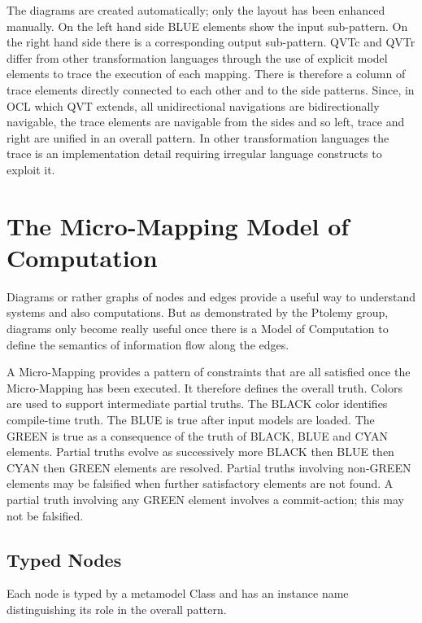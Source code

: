 \documentclass[conference]{IEEEtran}
\begin{document}
The diagrams are created automatically; only the layout has been enhanced manually. On the left hand side BLUE elements show the input sub-pattern. On the right hand side there is a corresponding output sub-pattern. QVTc and QVTr differ from other transformation languages through the use of explicit model elements to trace the execution of each mapping. There is therefore a column of trace elements directly connected to each other and to the side patterns. Since, in OCL which QVT extends, all unidirectional navigations are bidirectionally navigable, the trace elements are navigable from the sides and so left, trace and right are unified in an overall pattern. In other transformation languages the trace is an implementation detail requiring irregular language constructs to exploit it.

\section{The Micro-Mapping Model of Computation}\label{The Micro-Mapping Model of Computation}

Diagrams or rather graphs of nodes and edges provide a useful way to understand systems and also computations. But as demonstrated by the Ptolemy group, diagrams only become really useful once there is a Model of Computation \cite{moc} to define the semantics of information flow along the edges.%

A Micro-Mapping provides a pattern of constraints that are all satisfied once the Micro-Mapping has been executed. It therefore defines the overall truth. Colors are used to support intermediate partial truths. The BLACK color identifies compile-time truth. The BLUE is true after input models are loaded. The GREEN  is true as a consequence of the truth of BLACK, BLUE and CYAN elements. Partial truths evolve as successively more BLACK then BLUE then CYAN then GREEN elements are resolved. Partial truths involving non-GREEN elements may be falsified when further satisfactory elements are not found. A partial truth involving any GREEN element involves a commit-action; this may not be falsified. 

\subsection{Typed Nodes}

Each node is typed by a metamodel Class and has an instance name distinguishing its role in the overall pattern. 
\end{document}
